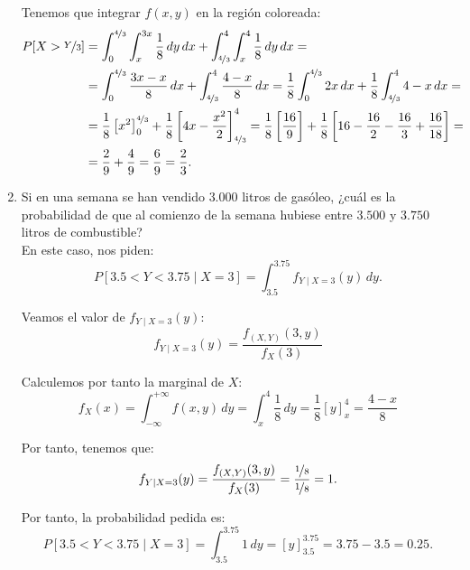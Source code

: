 \begin{ejercicio}
\begin{enumerate}
        Tenemos que integrar $f(x, y)$ en la región coloreada:
        \begin{align*}
            P[X > \nicefrac{Y}{3}] &=
            \int_{0}^{\nicefrac{4}{3}}
            \int_{x}^{3x} \frac{1}{8} \, dy \, dx + \int_{\nicefrac{4}{3}}^{4}
            \int_{x}^{4} \frac{1}{8} \, dy \, dx =\\&=
            \int_{0}^{\nicefrac{4}{3}} \frac{3x-x}{8} \, dx + \int_{\nicefrac{4}{3}}^{4} \frac{4-x}{8} \, dx = \dfrac{1}{8}\int_{0}^{\nicefrac{4}{3}} 2x \, dx + \dfrac{1}{8}\int_{\nicefrac{4}{3}}^{4} 4-x \, dx =\\&=
            \dfrac{1}{8}\left[x^2\right]_0^{\nicefrac{4}{3}} + \dfrac{1}{8}\left[4x-\dfrac{x^2}{2}\right]_{\nicefrac{4}{3}}^4
            = \dfrac{1}{8}\left[\dfrac{16}{9}\right] + \dfrac{1}{8}\left[16-\dfrac{16}{2}-\dfrac{16}{3}+\dfrac{16}{18}\right]
            =\\&= \dfrac{2}{9} + \dfrac{4}{9} = \dfrac{6}{9} = \dfrac{2}{3}.
        \end{align*}
        \item Si en una semana se han vendido $3.000$ litros de gasóleo, ¿cuál es la probabilidad de que al comienzo de la semana hubiese entre $3.500$ y $3.750$ litros de combustible?\\
        
        En este caso, nos piden:
        \begin{equation*}
            P[3.5 < Y < 3.75 \mid X = 3] = \int_{3.5}^{3.75} f_{Y\mid X=3} (y) \, dy.
        \end{equation*}

        Veamos el valor de $f_{Y\mid X=3} (y)$:
        \begin{equation*}
            f_{Y\mid X=3} (y) = \dfrac{f_{(X,Y)}(3, y)}{f_X(3)}
        \end{equation*}

        Calculemos por tanto la marginal de $X$:
        \begin{equation*}
            f_X(x) = \int_{-\infty}^{+\infty} f(x, y) \, dy = \int_{x}^{4} \dfrac{1}{8} \, dy = \frac{1}{8}\left[y\right]_x^4 = \frac{4-x}{8}
        \end{equation*}

        Por tanto, tenemos que:
        \begin{equation*}
            f_{Y\mid X=3} (y) = \dfrac{f_{(X,Y)}(3, y)}{f_X(3)} = \dfrac{\nicefrac{1}{8}}{\nicefrac{1}{8}} = 1.
        \end{equation*}

        Por tanto, la probabilidad pedida es:
        \begin{equation*}
            P[3.5 < Y < 3.75 \mid X = 3] = \int_{3.5}^{3.75} 1 \, dy = \left[y\right]_{3.5}^{3.75} = 3.75-3.5 = 0.25.
        \end{equation*}

    \end{enumerate}
\end{ejercicio}

